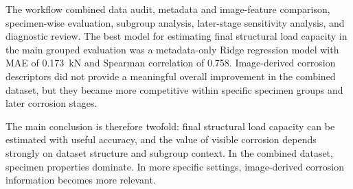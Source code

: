\documentclass[conference]{IEEEtran}
\begin{document}
The workflow combined data audit, metadata and image-feature comparison, specimen-wise evaluation, subgroup analysis, later-stage sensitivity analysis, and diagnostic review. The best model for estimating final structural load capacity in the main grouped evaluation was a metadata-only Ridge regression model with MAE of 0.173~kN and Spearman correlation of 0.758. Image-derived corrosion descriptors did not provide a meaningful overall improvement in the combined dataset, but they became more competitive within specific specimen groups and later corrosion stages.

The main conclusion is therefore twofold: final structural load capacity can be estimated with useful accuracy, and the value of visible corrosion depends strongly on dataset structure and subgroup context. In the combined dataset, specimen properties dominate. In more specific settings, image-derived corrosion information becomes more relevant.
\end{document}
